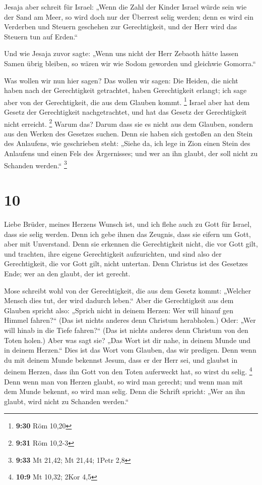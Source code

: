  Jesaja aber schreit für Israel: „Wenn die Zahl der
Kinder Israel würde sein wie der Sand am Meer, so wird doch nur der
Überrest selig werden;  denn es wird ein Verderben und
Steuern geschehen zur Gerechtigkeit, und der Herr wird das Steuern tun
auf Erden.``

 Und wie Jesaja zuvor sagte: „Wenn uns nicht der Herr
Zebaoth hätte lassen Samen übrig bleiben, so wären wir wie Sodom
geworden und gleichwie Gomorra.``

 Was wollen wir nun hier sagen? Das wollen wir sagen: Die
Heiden, die nicht haben nach der Gerechtigkeit getrachtet, haben
Gerechtigkeit erlangt; ich sage aber von der Gerechtigkeit, die aus dem
Glauben kommt. \footnote{\textbf{9:30} Röm 10,20}  Israel
aber hat dem Gesetz der Gerechtigkeit nachgetrachtet, und hat das Gesetz
der Gerechtigkeit nicht erreicht. \footnote{\textbf{9:31} Röm 10,2-3}
 Warum das? Darum dass sie es nicht aus dem Glauben,
sondern aus den Werken des Gesetzes suchen. Denn sie haben sich gestoßen
an den Stein des Anlaufens,  wie geschrieben steht:
„Siehe da, ich lege in Zion einen Stein des Anlaufens und einen Fels des
Ärgernisses; und wer an ihn glaubt, der soll nicht zu Schanden werden.``
\footnote{\textbf{9:33} Mt 21,42; Mt 21,44; 1Petr 2,8}

\hypertarget{section-3}{%
\section{10}\label{section-3}}

 Liebe Brüder, meines Herzens Wunsch ist, und ich flehe
auch zu Gott für Israel, dass sie selig werden.  Denn ich
gebe ihnen das Zeugnis, dass sie eifern um Gott, aber mit Unverstand.
 Denn sie erkennen die Gerechtigkeit nicht, die vor Gott
gilt, und trachten, ihre eigene Gerechtigkeit aufzurichten, und sind
also der Gerechtigkeit, die vor Gott gilt, nicht untertan.
 Denn Christus ist des Gesetzes Ende; wer an den glaubt,
der ist gerecht.

 Mose schreibt wohl von der Gerechtigkeit, die aus dem
Gesetz kommt: „Welcher Mensch dies tut, der wird dadurch leben.``
 Aber die Gerechtigkeit aus dem Glauben spricht also:
„Sprich nicht in deinem Herzen: Wer will hinauf gen Himmel fahren?{}``
(Das ist nichts anderes denn Christum herabholen.)  Oder:
„Wer will hinab in die Tiefe fahren?{}`` (Das ist nichts anderes denn
Christum von den Toten holen.)  Aber was sagt sie? „Das
Wort ist dir nahe, in deinem Munde und in deinem Herzen.`` Dies ist das
Wort vom Glauben, das wir predigen.  Denn wenn du mit
deinem Munde bekennst Jesum, dass er der Herr sei, und glaubst in deinem
Herzen, dass ihn Gott von den Toten auferweckt hat, so wirst du selig.
\footnote{\textbf{10:9} Mt 10,32; 2Kor 4,5}  Denn wenn
man von Herzen glaubt, so wird man gerecht; und wenn man mit dem Munde
bekennt, so wird man selig.  Denn die Schrift spricht:
„Wer an ihn glaubt, wird nicht zu Schanden werden.``

